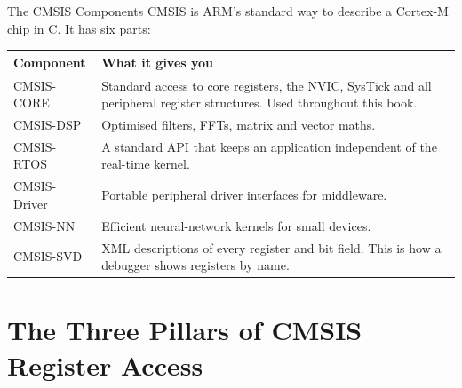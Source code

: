 \documentclass[9pt,aspectratio=169,xcolor=table]{beamer}
\begin{document}
\begin{frame}{The CMSIS Components}
    \leavevmode
    CMSIS is ARM's standard way to describe a Cortex-M chip in C. It has six parts:

    \vspace{2mm}
    \begin{center}
    {
    \striped
    \begin{tabular}{@{}l R{.66\textwidth}@{}}
        \toprule
        \textbf{Component} & \textbf{What it gives you} \\
        \midrule
        \alert{CMSIS-CORE} & Standard access to core registers, the NVIC, SysTick and all peripheral register structures. \alert{Used throughout this book.} \\
        CMSIS-DSP & Optimised filters, FFTs, matrix and vector maths. \\
        CMSIS-RTOS & A standard API that keeps an application independent of the real-time kernel. \\
        CMSIS-Driver & Portable peripheral driver interfaces for middleware. \\
        CMSIS-NN & Efficient neural-network kernels for small devices. \\
        CMSIS-SVD & XML descriptions of every register and bit field. This is how a debugger shows registers by name. \\
        \bottomrule
    \end{tabular}}
    \end{center}
\end{frame}


\section{The Three Pillars of CMSIS Register Access}
\end{document}
